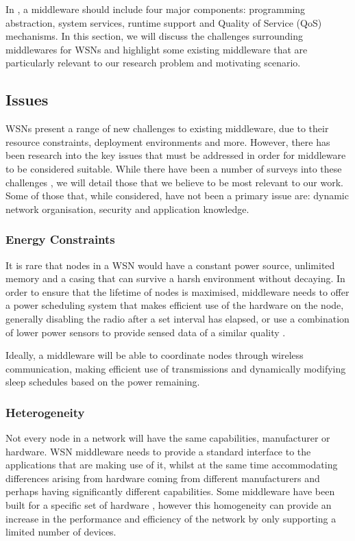 	In \cite{Wang2008c}, a middleware should include four major components: programming abstraction, system services, runtime support and Quality of Service (QoS) mechanisms. In this section, we will discuss the challenges surrounding middlewares for WSNs and highlight some existing middleware that are particularly relevant to our research problem and motivating scenario.

\subsection{Issues}\label{bg:sm:issues}
	WSNs present a range of new challenges to existing middleware, due to their resource constraints, deployment environments and more. However, there has been research into the key issues that must be addressed in order for middleware to be considered suitable.
	While there have been a number of surveys into these challenges \cite{Hadim2006, Rahman, Yu2004}, we will detail those that we believe to be most relevant to our work. Some of those that, while considered, have not been a primary issue are: dynamic network organisation, security and application knowledge.
	\subsubsection{Energy Constraints}
		It is rare that nodes in a WSN would have a constant power source, unlimited memory and a casing that can survive a harsh environment without decaying. In order to ensure that the lifetime of nodes is maximised, middleware needs to offer a power scheduling system that makes efficient use of the hardware on the node, generally disabling the radio after a set interval has elapsed, or use a combination of lower power sensors to provide sensed data of a similar quality \cite{Heinzelman2004}.

		Ideally, a middleware will be able to coordinate nodes through wireless communication, making efficient use of transmissions and dynamically modifying sleep schedules based on the power remaining.
	\subsubsection{Heterogeneity}
		Not every node in a network will have the same capabilities, manufacturer or hardware. WSN middleware needs to provide a standard interface to the applications that are making use of it, whilst at the same time accommodating differences arising from hardware coming from different manufacturers and perhaps having significantly different capabilities. Some middleware have been built for a specific set of hardware \cite{Tengg2007}, however this homogeneity can provide an increase in the performance and efficiency of the network by only supporting a limited number of devices.
